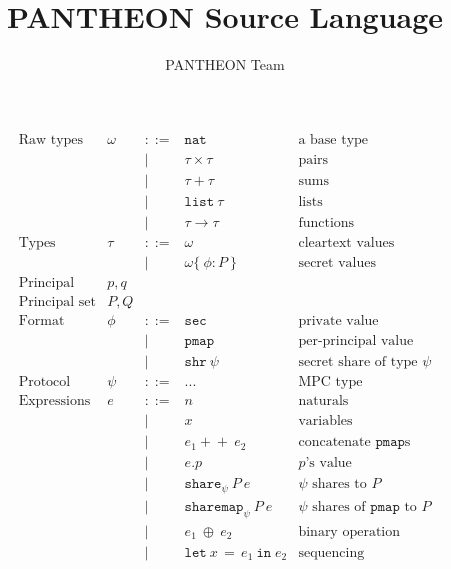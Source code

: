 \documentclass[10pt]{article}
\title{PANTHEON Source Language}
\author{PANTHEON Team}
\newcommand{\kw}[1]{\ensuremath{\mathtt{#1}}}
\newcommand{\tnat}{\ensuremath{\mathtt{nat}}}
\newcommand{\tlist}[1]{\ensuremath{\mathtt{list}~{#1}}}
\newcommand{\tfun}[2]{\ensuremath{{#1} \rightarrow {#2}}}
\newcommand{\tprod}[2]{\ensuremath{{#1} \times {#2}}}
\newcommand{\tsum}[2]{\ensuremath{{#1} + {#2}}}
\newcommand{\ssec}{\ensuremath{\mathtt{sec}}}
\newcommand{\isec}{\ensuremath{\mathtt{pmap}}}
\newcommand{\sshare}[1]{\ensuremath{\mathtt{shr}~{#1}}}
\newcommand{\sectyp}[3]{\ensuremath{{#1} \{~{#2}:{#3}~\}}}
\newcommand{\ebinop}[2]{\ensuremath{{#1}~\oplus~{#2}}}
\newcommand{\elet}[3]{\ensuremath{\kw{let}~#1\, =\, #2~\kw{in}\;{#3}}}
\newcommand{\eshare}[3]{\ensuremath{\kw{share}_{#1}~{#2}~{#3}}}
\newcommand{\esharemap}[3]{\ensuremath{\kw{sharemap}_{#1}~{#2}~{#3}}}
\newcommand{\econcat}[2]{\ensuremath{{#1} +\!\!+~ {#2}}}
\newcommand{\eaccval}[2]{\ensuremath{{#1}.{#2}}}
\begin{document}
\maketitle

\begin{figure}[h]
  \centering
  \[\begin{array}{rlcll}
      \text{Raw types} & \omega  & ::=  & \tnat & \text{a base type} \\      
                       && \mid & \tprod{\tau}{\tau} & \text{pairs} \\
                       && \mid & \tsum{\tau}{\tau} & \text{sums} \\
                       && \mid & \tlist{\tau} & \text{lists} \\
                       && \mid & \tfun{\tau}{\tau} & \text{functions} \\
      \text{Types} & \tau & ::= & \omega & \text{cleartext values} \\
                       && \mid & \sectyp\omega\phi{P} & \text{secret values} \\
      \text{Principal} & p, q \\
      \text{Principal set} & P, Q \\
      \text{Format} & \phi & ::= & \ssec & \text{private value}  \\
                       && \mid & \isec & \text{per-principal value}  \\
                       && \mid & \sshare{\psi} & \text{secret share of type $\psi$} \\
      \text{Protocol} & \psi & ::= & ... & \text{MPC type} \\
      \text{Expressions} & e & ::= & n & \text{naturals} \\
                       && \mid & x & \text{variables} \\
                       && \mid & \econcat{e_1}{e_2} & \text{concatenate $\isec$s}\\
                       && \mid & \eaccval{e}{p} & \text{$p$'s value}\\
                       && \mid & \eshare{\psi}{P}{e} & \text{$\psi$ shares to $P$} \\
                       && \mid & \esharemap{\psi}{P}{e} & \text{$\psi$ shares of $\isec$ to $P$} \\
                       && \mid & \ebinop{e_1}{e_2}  & \text{binary operation} \\
                       && \mid & \elet{x}{e_1}{e_2}  & \text{sequencing} \\

\end{array}\]
\end{figure}
\end{document}
